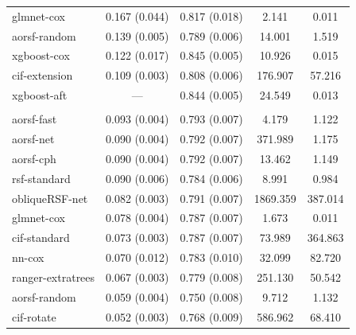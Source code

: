 \documentclass{article}\usepackage[]{graphicx}\usepackage[]{xcolor}
\newenvironment{knitrout}{}{} %
\begin{document}
\begin{knitrout}
\begin{longtable}[t]{lcccc}
\hspace{1em}glmnet-cox & 0.167 (0.044) & 0.817 (0.018) & 2.141 & 0.011\\
\hspace{1em}aorsf-random & 0.139 (0.005) & 0.789 (0.006) & 14.001 & 1.519\\
\hspace{1em}xgboost-cox & 0.122 (0.017) & 0.845 (0.005) & 10.926 & 0.015\\
\hspace{1em}cif-extension & 0.109 (0.003) & 0.808 (0.006) & 176.907 & 57.216\\
\hspace{1em}xgboost-aft & --- & 0.844 (0.005) & 24.549 & 0.013\\
\addlinespace[0.3em]
\multicolumn{5}{l}{\textit{\textbf{ARIC; stroke, n = 13623, p = 41}}}\\
\hline
\hspace{1em}aorsf-fast & 0.093 (0.004) & 0.793 (0.007) & 4.179 & 1.122\\
\hspace{1em}aorsf-net & 0.090 (0.004) & 0.792 (0.007) & 371.989 & 1.175\\
\hspace{1em}aorsf-cph & 0.090 (0.004) & 0.792 (0.007) & 13.462 & 1.149\\
\hspace{1em}rsf-standard & 0.090 (0.006) & 0.784 (0.006) & 8.991 & 0.984\\
\hspace{1em}obliqueRSF-net & 0.082 (0.003) & 0.791 (0.007) & 1869.359 & 387.014\\
\hspace{1em}glmnet-cox & 0.078 (0.004) & 0.787 (0.007) & 1.673 & 0.011\\
\hspace{1em}cif-standard & 0.073 (0.003) & 0.787 (0.007) & 73.989 & 364.863\\
\hspace{1em}nn-cox & 0.070 (0.012) & 0.783 (0.010) & 32.099 & 82.720\\
\hspace{1em}ranger-extratrees & 0.067 (0.003) & 0.779 (0.008) & 251.130 & 50.542\\
\hspace{1em}aorsf-random & 0.059 (0.004) & 0.750 (0.008) & 9.712 & 1.132\\
\hspace{1em}cif-rotate & 0.052 (0.003) & 0.768 (0.009) & 586.962 & 68.410\\

\end{longtable}
\end{knitrout}
\end{document}
